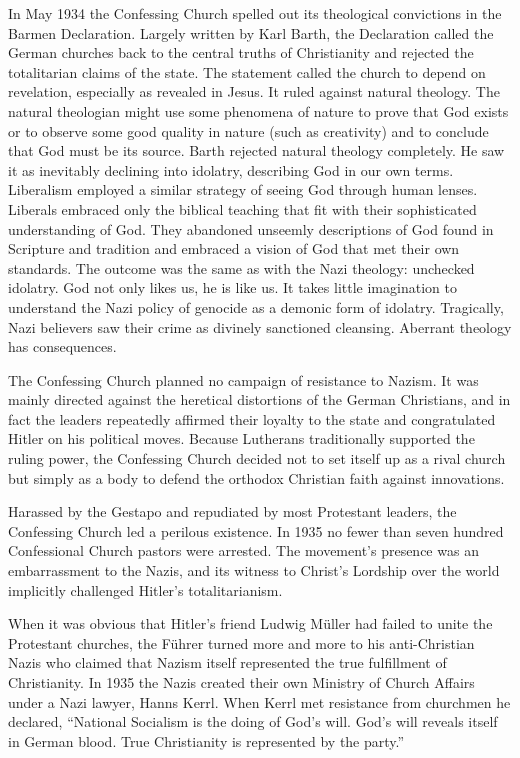 In May 1934 the Confessing Church spelled out its theological convictions in the Barmen Declaration.
Largely written by Karl Barth, the Declaration called the German churches back to the central truths
of Christianity and rejected the totalitarian claims of the state. The statement called the church
to depend on revelation, especially as revealed in Jesus. It ruled against natural theology. The
natural theologian might use some phenomena of nature to prove that God exists or to observe some
good quality in nature (such as creativity) and to conclude that God must be its source. Barth
rejected natural theology completely. He saw it as inevitably declining into idolatry, describing
God in our own terms. Liberalism employed a similar strategy of seeing God through human lenses.
Liberals embraced only the biblical teaching that fit with their sophisticated understanding of God.
They abandoned unseemly descriptions of God found in Scripture and tradition and embraced a vision
of God that met their own standards. The outcome was the same as with the Nazi theology: unchecked
idolatry. God not only likes us, he is like us. It takes little imagination to understand the Nazi
policy of genocide as a demonic form of idolatry. Tragically, Nazi believers saw their crime as
divinely sanctioned cleansing. Aberrant theology has consequences.

The Confessing Church planned no campaign of resistance to Nazism. It was mainly directed against
the heretical distortions of the German Christians, and in fact the leaders repeatedly affirmed
their loyalty to the state and congratulated Hitler on his political moves. Because Lutherans
traditionally supported the ruling power, the Confessing Church decided not to set itself up as a
rival church but simply as a body to defend the orthodox Christian faith against innovations.

Harassed by the Gestapo and repudiated by most Protestant leaders, the Confessing Church led a
perilous existence. In 1935 no fewer than seven hundred Confessional Church pastors were arrested.
The movement’s presence was an embarrassment to the Nazis, and its witness to Christ’s Lordship over
the world implicitly challenged Hitler’s totalitarianism.

When it was obvious that Hitler’s friend Ludwig Müller had failed to unite the Protestant churches,
the Führer turned more and more to his anti-Christian Nazis who claimed that Nazism itself
represented the true fulfillment of Christianity. In 1935 the Nazis created their own Ministry of
Church Affairs under a Nazi lawyer, Hanns Kerrl. When Kerrl met resistance from churchmen he
declared, “National Socialism is the doing of God’s will. God’s will reveals itself in German blood.
True Christianity is represented by the party.”

